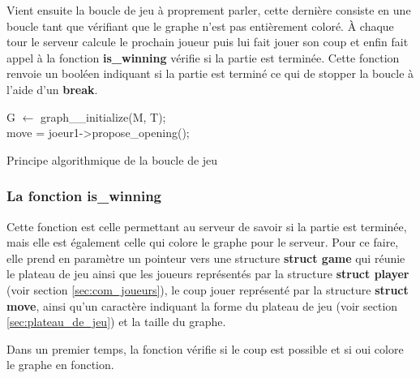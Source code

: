 Vient ensuite la boucle de jeu à proprement parler, cette dernière consiste en une boucle tant que vérifiant que le graphe n'est pas entièrement coloré. À chaque tour le serveur calcule le prochain joueur puis lui fait jouer son coup et enfin fait appel à la fonction \textbf{is\_winning} vérifie si la partie est terminée. Cette fonction renvoie un booléen indiquant si la partie est terminé ce qui de stopper la boucle à l'aide d'un \textbf{break}.\\

\begin{algorithm}[H]

G $\leftarrow$ graph\_\_initialize(M, T);\\
move = joeur1->propose\_opening();\\   

\caption{Principe algorithmique de la boucle de jeu}
\end{algorithm}

\subsubsection{La fonction \textbf{is\_winning}}
Cette fonction est celle permettant au serveur de savoir si la partie est terminée, mais elle est également celle qui colore le graphe pour le serveur. Pour ce faire, elle prend en paramètre un pointeur vers une structure \textbf{struct game} qui réunie le plateau de jeu ainsi que les joueurs représentés par la structure \textbf{struct player} (voir section \ref{sec:com_joueurs}), le coup jouer représenté par la structure \textbf{struct move}, ainsi qu'un caractère indiquant la forme du plateau de jeu (voir section \ref{sec:plateau_de_jeu}) et la taille du graphe.

Dans un premier temps, la fonction vérifie si le coup est possible et si oui colore le graphe en fonction.

